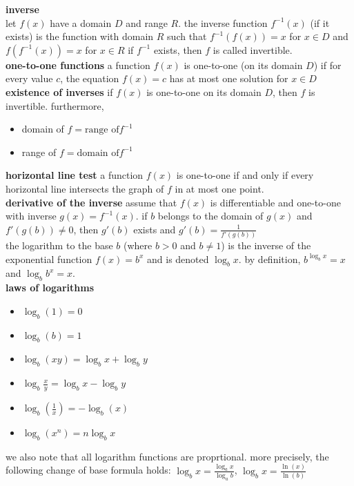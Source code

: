 \documentclass{article}
\begin{document}
\textbf{inverse}\\
let $f(x)$ have a domain $D$ and range $R$. the inverse function $f^{-1}(x)$ (if it exists) is the function with domain $R$ such that $f^{-1}(f(x)) = x$ for $x \in D$ and $f(f^{-1}(x)) = x$ for $x \in R$ if $f^{-1}$ exists, then $f$ is called invertible.\\

\textbf{one-to-one functions} a function $f(x)$ is one-to-one (on its domain $D$) if for every value $c$, the equation $f(x) = c$ has at most one solution for $x \in D$\\

\textbf{existence of inverses} if $f(x)$ is one-to-one on its domain $D$, then $f$ is invertible. furthermore,
	\begin{itemize}
		\item domain of $f = \text{range of} f^{-1}$
		\item range of $f = \text{domain of} f^{-1}$ 
	\end{itemize}

\textbf{horizontal line test} a function $f(x)$ is one-to-one if and only if every horizontal line intersects the graph of $f$ in at most one point.\\

\textbf{derivative of the inverse} assume that $f(x)$ is differentiable and one-to-one with inverse $g(x) = f^{-1}(x)$. if $b$ belongs to the domain of $g(x)$ and $f'(g(b)) \neq 0$, then $g'(b)$ exists and $g'(b) = \frac{1}{f'(g(b))}$\\

the logarithm to the base $b$ (where $b > 0$ and $b \neq 1$) is the inverse of the exponential function $f(x) = b^x$ and is denoted $\log_{b}x$. by definition, $b^{\log_{b}x} = x$ and $\log_{b}b^x = x$.\\

\textbf{laws of logarithms}
	\begin{itemize}
		\item $\log_{b}(1) = 0$
		\item $\log_{b}(b) = 1$
		\item $\log_{b}(xy) = \log_{b}x + \log_{b}y$
		\item $\log_{b}\frac{x}{y} = \log_{b}x - \log_{b}y$
		\item $\log_{b}(\frac{1}{x}) = -\log_{b}(x)$
		\item $\log_{b}(x^n) = n\log_{b}x$
	\end{itemize}
we also note that all logarithm functions are proprtional. more precisely, the following change of base formula holds: $\log_{b}x = \frac{\log_{a}x}{\log_{a}b}$, $\log_{b}x = \frac{\ln(x)}{\ln(b)}$\\
\end{document}
